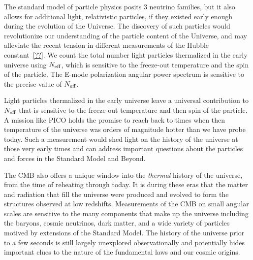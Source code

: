 \documentclass[PICOReport.tex]{subfiles}
\begin{document}
The standard model of particle physics posits 3 neutrino families, but it also allows for additional light, relativistic particles, if 
they existed early enough during the evolution of the Universe. The discovery of such particles would revolutionize 
our understanding of the particle content of the Universe, 
and may alleviate the recent tension in different measurements of the Hubble constant~\ref{??}.  We count the total number 
light particles thermalized in the early universe using ${N_{\rm eff}}$, which is sensitive to the freeze-out temperature and 
the spin of the particle. The E-mode polarization angular power spectrum is sensitive to the precise value of ${N_{\rm eff}}$.  

Light particles thermalized in the early universe leave a universal contribution to ${N_{\rm eff}}$ that is sensitive to the 
freeze-out temperature and then spin of the particle.  A mission like PICO holds the promise to reach 
back to times when then temperature of the universe was orders of magnitude hotter than we have probe today.  
Such a measurement would shed light on the history of the universe at those very early times and can address 
important questions about the particles and forces in the Standard Model and Beyond.


The CMB also offers a unique window into the {\it thermal} history of the universe, from the time of reheating through today.  
It is during these eras that the matter and radiation that fill the universe were produced and evolved to form the structures 
observed at low redshifts.  Measurements of the CMB on small angular scales are sensitive to the many components 
that make up the universe including the baryons, cosmic neutrinos, dark matter, and a wide variety of particles 
motived by extensions of the Standard Model.  The history of the universe prior to a few seconds is still largely 
unexplored observationally and potentially hides important clues to the nature of the fundamental laws and our cosmic origins.
\end{document}
